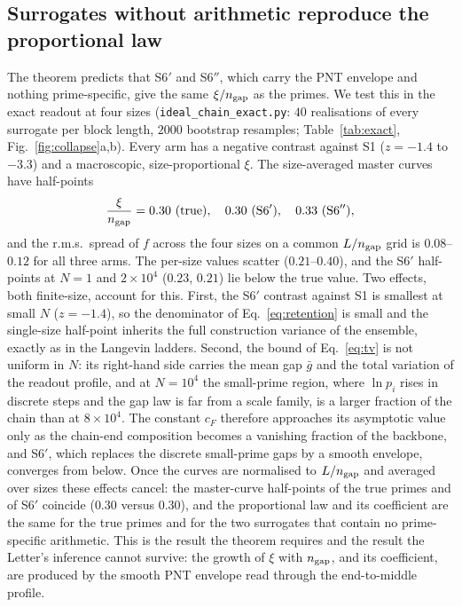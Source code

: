 \documentclass[reprint,amsmath,amssymb,aps,pre,longbibliography]{revtex4-2}
\begin{document}
\subsection{Surrogates without arithmetic reproduce the proportional law}

The theorem predicts that S6$'$ and S6$''$, which carry the PNT envelope and nothing
prime-specific, give the same $\xi/n_{\rm gap}$ as the primes. We test this in the exact
readout at four sizes (\texttt{ideal\_chain\_exact.py}: $40$ realisations of every
surrogate per block length, $2000$ bootstrap resamples; Table~\ref{tab:exact},
Fig.~\ref{fig:collapse}a,b). Every arm has a negative contrast against S1 ($z=-1.4$ to
$-3.3$) and a macroscopic, size-proportional $\xi$. The size-averaged master curves have
half-points
\begin{equation}
\frac{\xi}{n_{\rm gap}}=0.30\ (\text{true}),\quad 0.30\ (\text{S6}'),\quad 0.33\ (\text{S6}''),
\end{equation}
and the r.m.s.\ spread of $f$ across the four sizes on a common $L/n_{\rm gap}$ grid is
$0.08$--$0.12$ for all three arms. The per-size values scatter ($0.21$--$0.40$), and the
S6$'$ half-points at $N=1$ and $2\times10^{4}$ ($0.23$, $0.21$) lie below the true value.
Two effects, both finite-size, account for this. First, the S6$'$ contrast against S1 is
smallest at small $N$ ($z=-1.4$), so the denominator of Eq.~\eqref{eq:retention} is small
and the single-size half-point inherits the full construction variance of the ensemble,
exactly as in the Langevin ladders. Second, the bound of Eq.~\eqref{eq:tv} is not
uniform in $N$: its right-hand side carries the mean gap $\bar g$ and the total variation of
the readout profile, and at $N=10^{4}$ the small-prime region, where $\ln p_i$ rises in
discrete steps and the gap law is far from a scale family, is a larger fraction of the chain
than at $8\times10^{4}$. The constant $c_F$ therefore approaches its asymptotic value only as
the chain-end composition becomes a vanishing fraction of the backbone, and S6$'$, which
replaces the discrete small-prime gaps by a smooth envelope, converges from below. Once the
curves are normalised to $L/n_{\rm gap}$ and averaged over sizes these effects cancel: the
master-curve half-points of the true primes and of S6$'$ coincide ($0.30$ versus $0.30$),
and the proportional law and its coefficient are the same for the true primes and for the
two surrogates that contain no prime-specific arithmetic. This is the result the
theorem requires and the result the Letter's inference cannot survive: the growth of $\xi$
with $n_{\rm gap}$, and its coefficient, are produced by the smooth PNT envelope read
through the end-to-middle profile.
\end{document}
